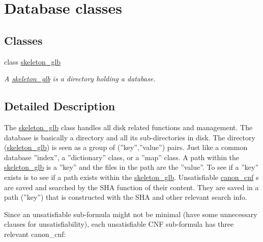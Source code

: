 \hypertarget{group__docgrp__database__classes}{\section{Database classes}
\label{group__docgrp__database__classes}
}
\subsection*{Classes}
\begin{DoxyCompactItemize}
\item 
class \hyperlink{classskeleton__glb}{skeleton\+\_\+glb}
\begin{DoxyCompactList}\small\item\em A \hyperlink{classskeleton__glb}{skeleton\+\_\+glb} is a directory holding a database. \end{DoxyCompactList}\end{DoxyCompactItemize}


\subsection{Detailed Description}
The \hyperlink{classskeleton__glb}{skeleton\+\_\+glb} class handles all disk related functions and management. The database is basically a directory and all its sub-\/directories in disk. The directory (\hyperlink{classskeleton__glb}{skeleton\+\_\+glb}) is seen as a group of (''key'',''value'') pairs. Just like a common database ''index'', a ''dictionary'' class, or a ''map'' class. A path within the \hyperlink{classskeleton__glb}{skeleton\+\_\+glb} is a ''key'' and the files in the path are the ''value''. To see if a ''key'' exists is to see if a path exists within the \hyperlink{classskeleton__glb}{skeleton\+\_\+glb}. Unsatisfiable \hyperlink{classcanon__cnf}{canon\+\_\+cnf} s are saved and searched by the S\+H\+A function of their content. They are saved in a path (''key'') that is constructed with the S\+H\+A and other relevant search info.

Since an unsatisfiable sub-\/formula might not be minimal (have some unnecessary clauses for unsatisfiability), each unsatisfiable C\+N\+F sub-\/formula has three relevant canon\+\_\+cnf\+:


